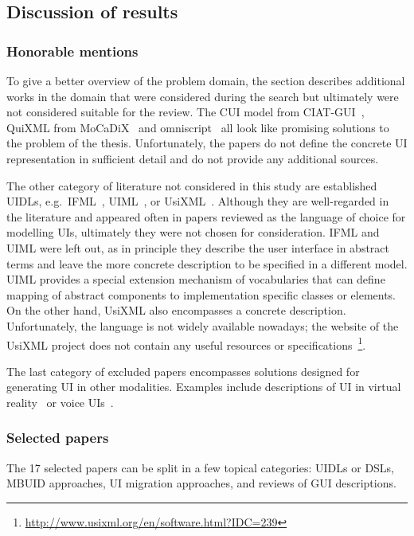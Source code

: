 \subsection{Discussion of results}\label{subsec:review-discussion-of-results}

\subsubsection{Honorable mentions}
To give a better overview of the problem domain, the section describes additional works in the domain that were considered during the search but ultimately were not considered suitable for the review.
The CUI model from CIAT-GUI~\cite{Molina2012-my}, QuiXML from MoCaDiX~\cite{Vanderdonckt2019-av} and omniscript~\cite{Ulusoy2019-jh} all look like promising solutions to the problem of the thesis.
Unfortunately, the papers do not define the concrete UI representation in sufficient detail and do not provide any additional sources.

The other category of literature not considered in this study are established UIDLs, e.g.\ IFML~\cite{Brambilla2014-ln}, UIML~\cite{Abrams1999}, or UsiXML~\cite{Limbourg2005}.
Although they are well-regarded in the literature and appeared often in papers reviewed as the language of choice for modelling UIs, ultimately they were not chosen for consideration.
IFML and UIML were left out, as in principle they describe the user interface in abstract terms and leave the more concrete description to be specified in a different model.
UIML provides a special extension mechanism of vocabularies that can define mapping of abstract components to implementation specific classes or elements.
On the other hand, UsiXML also encompasses a concrete description.
Unfortunately, the language is not widely available nowadays;
the website of the UsiXML project does not contain any useful resources or specifications~\footnote{\url{http://www.usixml.org/en/software.html?IDC=239}}.

The last category of excluded papers encompasses solutions designed for generating UI in other modalities.
Examples include descriptions of UI in virtual reality~\cite{Olmedo2015} or voice UIs~\cite{steinberger2020domain}.

\subsubsection{Selected papers}

The 17 selected papers can be split in a few topical categories: UIDLs or DSLs, MBUID approaches, UI migration approaches, and reviews of GUI descriptions.

